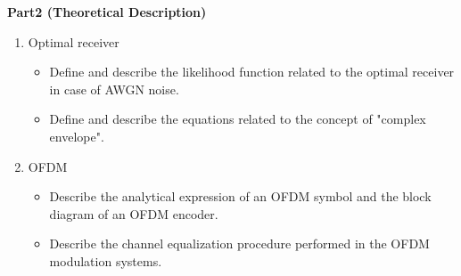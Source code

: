 \documentclass[11pt]{article}
\begin{document}
{\bf Part2 (Theoretical Description)} \\
\begin{enumerate}
\item Optimal receiver
\begin{itemize}
\item Define and describe the likelihood function related to the optimal receiver in case of AWGN noise.
\item Define and describe the equations related to the concept of "complex envelope". %
\end{itemize}

\item OFDM
\begin{itemize}
\item Describe the analytical expression of an OFDM symbol and the block diagram of an OFDM encoder.
\item Describe the channel equalization procedure performed in the OFDM modulation systems.


\end{itemize}


\end{enumerate}
\end{document}

